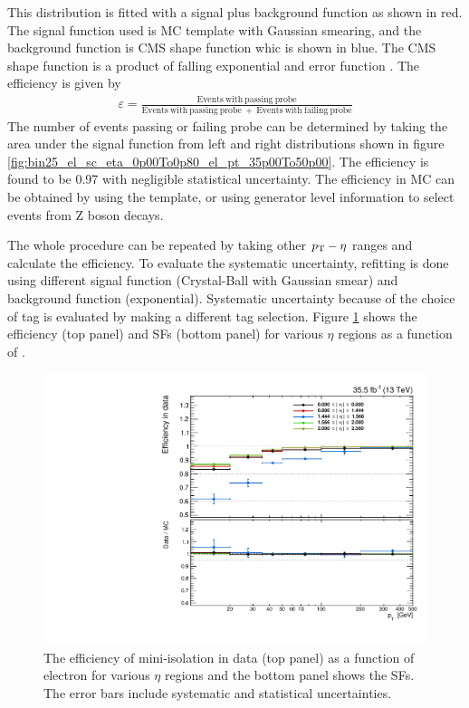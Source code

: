 This distribution is fitted with a signal plus background function as shown in red. The signal function used is MC template with 
Gaussian smearing, and the background function is CMS shape function whic is shown in blue.
The CMS shape function is a product of falling exponential and error function \cite{Meyer:2239058}. The 
efficiency is given by
\begin{eqnarray}
\varepsilon = \mathrm{\frac{Events\ with\ passing\ probe}{Events\ with\ passing\ probe\ +\ Events\ with\ failing\ probe}}
\end{eqnarray}
The number of events passing or failing probe can be determined by taking the area under the signal function from left and right
distributions shown in figure \ref{fig:bin25_el_sc_eta_0p00To0p80_el_pt_35p00To50p00}. The efficiency is found to be 0.97 
with negligible statistical uncertainty. The efficiency in MC can be obtained by using the template, or using generator level information
to select events from Z boson decays.

The whole procedure can be repeated by taking other $p_{\mathrm{T}}-\eta$ ranges and calculate the efficiency. To evaluate the systematic 
uncertainty, refitting is done using different signal function (Crystal-Ball \cite{Oreglia:1980cs} with Gaussian smear) and background function (exponential). 
Systematic uncertainty because of the choice of tag is evaluated by making a different tag selection. Figure \ref{fig:MiniIsoSF} shows the 
efficiency (top panel) and SFs (bottom panel) for various $\eta$ regions as a function of \pt.
\begin{figure}[h!]
\centering
\includegraphics[width=0.6\linewidth]{../Figures/Chap2/MiniIsoSF}
\captionsetup{width=.9\linewidth}
\caption[Mini-isolation efficiency and SF]{The efficiency of mini-isolation in data (top panel) as a function of electron \pt for various $\eta$ regions and the bottom panel shows the SFs. The error bars include systematic and statistical uncertainties.}
\label{fig:MiniIsoSF}
\end{figure}

